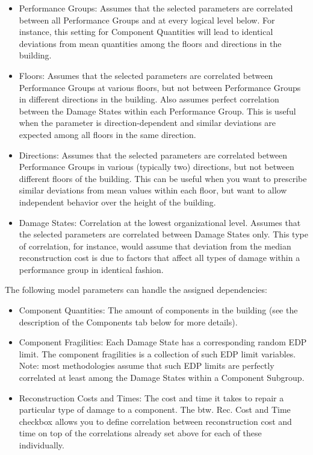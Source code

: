 \begin{itemize}
\begin{itemize}
        \item Performance Groups: Assumes that the selected parameters are correlated between all Performance Groups and at every logical level below. For instance, this setting for Component Quantities will lead to identical deviations from mean quantities among the floors and directions in the building.
        \item Floors: Assumes that the selected parameters are correlated between Performance Groups at various floors, but not between Performance Groups in different directions in the building. Also assumes perfect correlation between the Damage States within each Performance Group. This is useful when the parameter is direction-dependent and similar deviations are expected among all floors in the same direction.
        \item Directions: Assumes that the selected parameters are correlated between Performance Groups in various (typically two) directions, but not between different floors of the building. This can be useful when you want to prescribe similar deviations from mean values within each floor, but want to allow independent behavior over the height of the building.
        \item Damage States: Correlation at the lowest organizational level. Assumes that the selected parameters are correlated between Damage States only. This type of correlation, for instance, would assume that deviation from the median reconstruction cost is due to factors that affect all types of damage within a performance group in identical fashion.
    \end{itemize}
    The following model parameters can handle the assigned dependencies:
    \begin{itemize}
        \item Component Quantities: The amount of components in the building (see the description of the Components tab below for more details).
        \item Component Fragilities: Each Damage State has a corresponding random EDP limit. The component fragilities is a collection of such EDP limit variables.\\
        Note: most methodologies assume that such EDP limits are perfectly correlated at least among the Damage States within a Component Subgroup.
        \item Reconstruction Costs and Times: The cost and time it takes to repair a particular type of damage to a component. The btw. Rec. Cost and Time checkbox allows you to define correlation between reconstruction cost and time on top of the correlations already set above for each of these individually. \\

\end{itemize}
\end{itemize}
